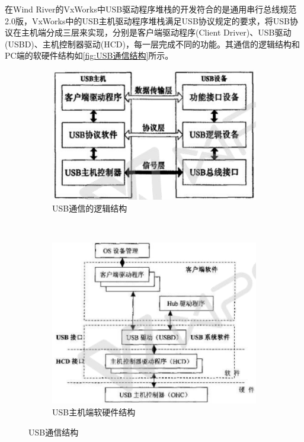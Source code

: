 	在Wind River的VxWorks中USB驱动程序堆栈的开发符合的是通用串行总线规范2.0版，VxWorks中的USB主机驱动程序堆栈满足USB协议规定的要求，将USB协议在主机端分成三层来实现，分别是客户端驱动程序(Client Driver)、USB驱动(USBD)、主机控制器驱动(HCD)，每一层完成不同的功能。其通信的逻辑结构和PC端的软硬件结构如\autoref{fig:USB通信结构}所示。
\begin{figure}[h]
\centering
  \begin{subfigure}[b]{0.4\textwidth}
  \includegraphics[width=1.0\textwidth]{./graphics/USB-device-structure-diagram.pdf}
  \caption{USB通信的逻辑结构}\label{fig:usb通信逻辑结构}
  \end{subfigure}
  ~
  \begin{subfigure}[b]{0.5\textwidth}
  \includegraphics[width=1.0\textwidth]{./graphics/USB-PC-structure.pdf}
  \caption{USB主机端软硬件结构}\label{fig:usb-PC}
  \end{subfigure}
\caption{USB通信结构}\label{fig:USB通信结构}
\end{figure}
	
